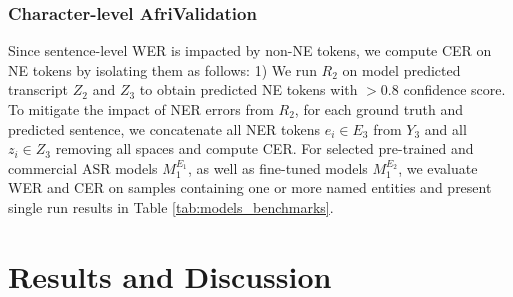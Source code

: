 \documentclass{INTERSPEECH2023}
\begin{document}
\subsubsection{Character-level AfriValidation}\label{section:char-afriVal}
Since sentence-level WER is impacted by non-NE tokens, we compute CER on NE tokens by isolating them as follows: 1) We run $R_2$ on model predicted transcript $Z_2$ and $Z_3$ to obtain predicted NE tokens with $>0.8$ confidence score. To mitigate the impact of NER errors from $R_2$, for each ground truth and predicted sentence, we concatenate all NER tokens $e_i \in E_3$ from $Y_3$ and all $z_i \in Z_3$ removing all spaces and compute CER.
For selected pre-trained and commercial ASR models $M_{1}^{E_{1}}$, as well as fine-tuned models $M_{1}^{E_{2}}$, we evaluate WER and CER on samples containing one or more named entities and present single run results in Table \ref{tab:models_benchmarks}.







\section{Results and Discussion}
\end{document}
